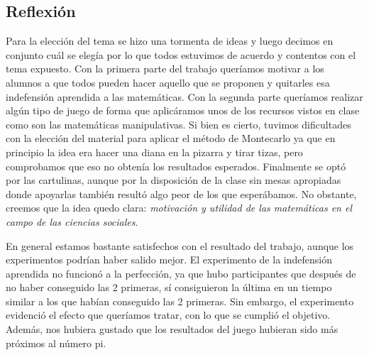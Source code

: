 \subsection{Reflexión}

Para la elección del tema se hizo una tormenta de ideas y luego decimos en conjunto cuál se elegía por lo que todos estuvimos de acuerdo y contentos con el tema expuesto.
%
Con la primera parte del trabajo queríamos motivar a los alumnos a que todos pueden hacer aquello que se proponen y quitarles esa indefensión aprendida a las matemáticas.
%
Con la segunda parte queríamos realizar algún tipo de juego de forma que aplicáramos unos de los recursos vistos en clase como son las matemáticas manipulativas.
%
Si bien es cierto, tuvimos dificultades con la elección del material para aplicar el método de Montecarlo ya que en principio la idea era hacer una diana en la pizarra y tirar tizas, pero comprobamos que eso no obtenía los resultados esperados.
%
Finalmente se optó por las cartulinas, aunque por la disposición de la clase sin mesas apropiadas donde apoyarlas también resultó algo peor de los que esperábamos.
%
No obstante, creemos que la idea quedo clara: \textit{motivación y utilidad de las matemáticas en el campo de las ciencias sociales}.

En general estamos bastante satisfechos con el resultado del trabajo, aunque los experimentos podrían haber salido mejor. 
%
El experimento de la indefensión aprendida no funcionó a la perfección, ya que hubo participantes que después de no haber conseguido las 2 primeras, sí consiguieron la última en un tiempo similar a los que habían conseguido las 2 primeras.
%
Sin embargo, el experimento evidenció el efecto que queríamos tratar, con lo que se cumplió el objetivo.
%
Además, nos hubiera gustado que los resultados del juego hubieran sido más próximos al número pi.




